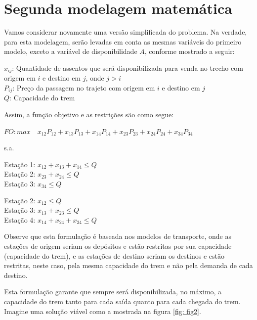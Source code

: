 \section{Segunda modelagem matemática}\label{sec:modelo2}

Vamos considerar novamente uma versão simplificada do problema. Na verdade, para esta modelagem, serão levadas em conta as mesmas variáveis do primeiro modelo, exceto a variável de disponibilidade \(A\), conforme mostrado a seguir:

\noindent $x_{ij}$: Quantidade de assentos que será disponibilizada para venda no trecho com origem em $i$ e destino em $j$, onde $j>i$ \\
\noindent $P_{ij}$: Preço da passagem no trajeto com origem em $i$ e destino em $j$ \\
\noindent $Q$: Capacidade do trem

\noindent Assim, a função objetivo e as restrições são como segue:

$FO: max \quad x_{12}P_{12} + x_{13}P_{13} + x_{14}P_{14} + x_{23}P_{23} + x_{24}P_{24} + x_{34}P_{34}$

s.a.


Estação 1: $x_{12} + x_{13} + x_{14} \leq Q $ \\
\indent Estação 2: $x_{23} + x_{24}  \leq  Q $ \\
\indent Estação 3: $x_{34} \leq Q $


Estação 2: $x_{12} \leq Q $ \\
\indent Estação 3: $x_{13} + x_{23}  \leq  Q $ \\
\indent Estação 4: $x_{14} + x_{24} + x_{34} \leq Q $

Observe que esta formulação é baseada nos modelos de transporte, onde as estações de origem seriam os depósitos e estão restritas por sua capacidade (capacidade do trem), e as estações de destino seriam os destinos e estão restritas, neste caso, pela mesma capacidade do trem e não pela demanda de cada destino.

Esta formulação garante que sempre será disponibilizada, no máximo, a capacidade do trem tanto para cada saída quanto para cada chegada do trem. Imagine uma solução viável como a mostrada na figura \ref{fig: fig2}.

